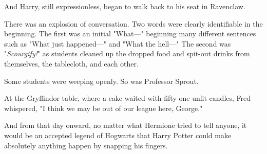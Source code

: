 And Harry, still expressionless, began to walk back to his seat in Ravenclaw.

There was an explosion of conversation. Two words were clearly identifiable in
the beginning. The first was an initial "What\mbox{---}" beginning many different
sentences such as "What just happened\mbox{---}" and "What the hell\mbox{---}" The second was
"\emph{Scourgify!}" as students cleaned up the dropped food and spit-out drinks
from themselves, the tablecloth, and each other.

Some students were weeping openly. So was Professor Sprout.

At the Gryffindor table, where a cake waited with fifty-one unlit candles, Fred
whispered, "I think we may be out of our league here, George."

And from that day onward, no matter what Hermione tried to tell anyone, it
would be an accepted legend of Hogwarts that Harry Potter could make absolutely
anything happen by snapping his fingers.
